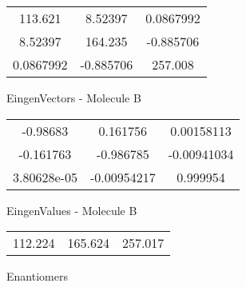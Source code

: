 \begin{multicols}{2}
\begin{center}
\begin{tabular}{|c c c|}
113.621	 & 	8.52397	 & 	0.0867992	 \\
8.52397	 & 	164.235	 & 	-0.885706	 \\
0.0867992	 & 	-0.885706	 & 	257.008
\end{tabular}

\vtab
 EingenVectors - Molecule B     \\
\vtab
\begin{tabular}{|c c c|}
-0.98683	 & 	0.161756	 & 	0.00158113	 \\
-0.161763	 & 	-0.986785	 & 	-0.00941034	 \\
3.80628e-05	 & 	-0.00954217	 & 	0.999954
\end{tabular}

\vtab
 EingenValues - Molecule B     \\
\vtab
\begin{tabular}{|c c c|}
112.224	 & 	165.624	 & 	257.017	 \\
\end{tabular}

\end{center}
\end{multicols}
\begin{center}
\vtab
\vtab
\textcolor{NavyBlue}{\Large Enantiomers}
\end{center}

 \newpage

